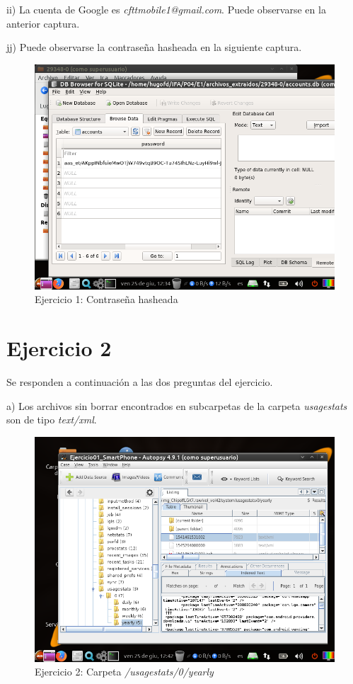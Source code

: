\documentclass[11pt]{article}
\begin{document}
ii) La cuenta de Google es \textit{cfttmobile1@gmail.com}. Puede observarse en la anterior captura.

jj) Puede observarse la contraseña hasheada en la siguiente captura.

\begin{figure}[H]
    \caption{Ejercicio 1: Contraseña hasheada}
    \centering
    \includegraphics[scale=0.7]{e1-33.png}
\end{figure}

\section{Ejercicio 2}
Se responden a continuación a las dos preguntas del ejercicio.

a) Los archivos sin borrar encontrados en subcarpetas de la carpeta \textit{usagestats} son de tipo \textit{text/xml}.

\begin{figure}[H]
    \caption{Ejercicio 2: Carpeta \textit{/usagestats/0/yearly}}
    \centering
    \includegraphics[scale=0.7]{e2-1.png}
\end{figure}
\end{document}
